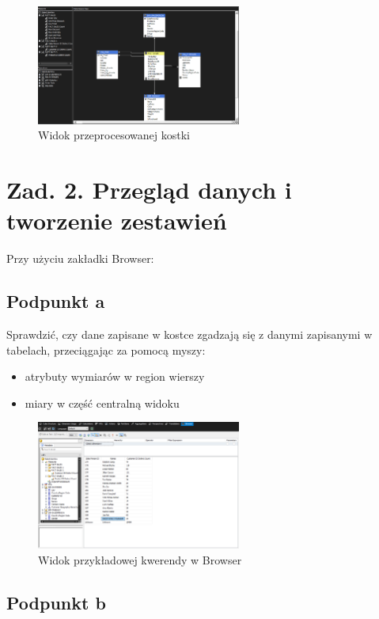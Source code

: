 \documentclass[a4paper,12pt]{article}
\begin{document}
\begin{figure}[H]
  \includegraphics[width=0.6\textwidth]{images/1d.png}
  \caption{Widok przeprocesowanej kostki}
\end{figure}

\section{Zad. 2. Przegląd danych i tworzenie zestawień}

Przy użyciu zakładki Browser:

\subsection{Podpunkt a}

Sprawdzić, czy dane zapisane w kostce zgadzają się z danymi zapisanymi w tabelach, przeciągając za pomocą myszy:
\begin{itemize}
  \item atrybuty wymiarów w region wierszy
  \item miary w część centralną widoku
\end{itemize}

\begin{figure}[H]
  \includegraphics[width=0.6\textwidth]{images/2a.png}
  \caption{Widok przykładowej kwerendy w Browser}
\end{figure}

\subsection{Podpunkt b}
\end{document}
